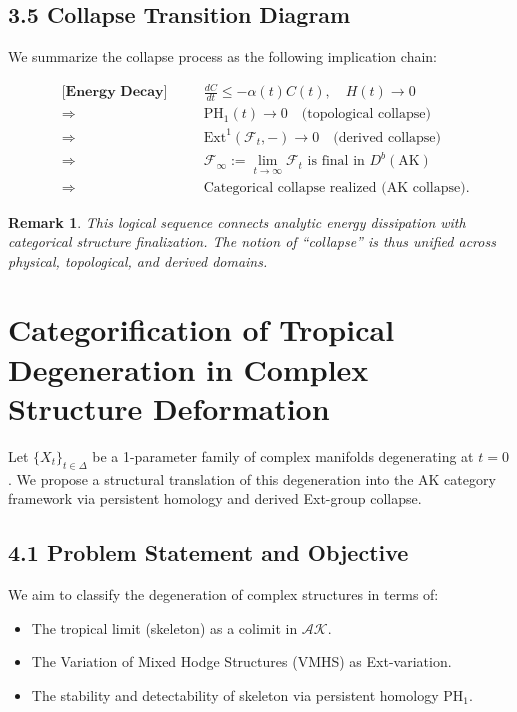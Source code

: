 \documentclass[11pt]{article}
\newtheorem{remark}[theorem]{Remark}
\begin{document}
\subsection{3.5 Collapse Transition Diagram}

We summarize the collapse process as the following implication chain:

\begin{align*}
&\textbf{[Energy Decay]} \quad && \frac{dC}{dt} \leq -\alpha(t) C(t), \quad H(t) \to 0 \\
&\Longrightarrow \quad && \mathrm{PH}_1(t) \to 0 \quad \text{(topological collapse)} \\
&\Longrightarrow \quad && \mathrm{Ext}^1(\mathcal{F}_t, -) \to 0 \quad \text{(derived collapse)} \\
&\Longrightarrow \quad && \mathcal{F}_\infty := \lim_{t \to \infty} \mathcal{F}_t \text{ is final in } D^b(\mathrm{AK}) \\
&\Longrightarrow \quad && \text{Categorical collapse realized (AK collapse).}
\end{align*}

\begin{remark}
This logical sequence connects analytic energy dissipation with categorical structure finalization. The notion of “collapse” is thus unified across physical, topological, and derived domains.
\end{remark}



\section{Categorification of Tropical Degeneration in Complex Structure Deformation}

Let \( \{X_t\}_{t \in \Delta} \) be a 1-parameter family of complex manifolds degenerating at \( t=0 \).  
We propose a structural translation of this degeneration into the AK category framework via persistent homology and derived Ext-group collapse.

\subsection{4.1 Problem Statement and Objective}

We aim to classify the degeneration of complex structures in terms of:

\begin{itemize}
    \item The tropical limit (skeleton) as a colimit in \( \mathcal{AK} \).
    \item The Variation of Mixed Hodge Structures (VMHS) as Ext-variation.
    \item The stability and detectability of skeleton via persistent homology \( \mathrm{PH}_1 \).
\end{itemize}
\end{document}
